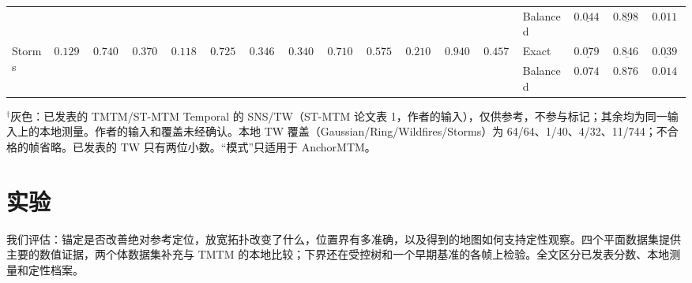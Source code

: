 \documentclass[fontset=none,zihao=5,a4paper]{ctexart}
\begin{document}
\begin{table}[htbp]
{\begin{tabular}{@{}l*{12}{c}lccc@{}}
 &  &  &  &  &  &  &  &  &  &  &  &  & Balanced & $\underline{0.0447}$ & $\underline{0.8989}$ & $\mathbf{0.0116}$ \\
\multirow{2}{*}{Storms} & \multirow{2}{*}{$0.1290$} & \multirow{2}{*}{$0.7403$} & \multirow{2}{*}{$0.3705$} & \multirow{2}{*}{$0.1180$} & \multirow{2}{*}{$0.7251$} & \multirow{2}{*}{$0.3468$} & \multirow{2}{*}{\textcolor{pubgray}{$0.3400$}} & \multirow{2}{*}{\textcolor{pubgray}{$0.7100$}} & \multirow{2}{*}{$0.5753$} & \multirow{2}{*}{\textcolor{pubgray}{$0.2100$}} & \multirow{2}{*}{\textcolor{pubgray}{$0.9400$}} & \multirow{2}{*}{$0.4579$} & Exact & $\underline{0.0790}$ & $\underline{0.8463}$ & $\underline{0.0399}$ \\
 &  &  &  &  &  &  &  &  &  &  &  &  & Balanced & $\mathbf{0.0743}$ & $\mathbf{0.8766}$ & $\mathbf{0.0140}$ \\
\bottomrule
\end{tabular}}
\par\smallskip
\parbox{\linewidth}{\footnotesize $^\dagger$灰色：已发表的 TMTM/ST-MTM Temporal 的 SNS/TW（ST-MTM 论文表 1，作者的输入），仅供参考，不参与标记；其余均为同一输入上的本地测量。作者的输入和覆盖未经确认。本地 TW 覆盖（Gaussian/Ring/Wildfires/Storms）为 64/64、1/40、4/32、11/744；不合格的帧省略。已发表的 TW 只有两位小数。“模式”只适用于 AnchorMTM。}
\end{table}

\section{实验}\label{sec:experiments}
我们评估：锚定是否改善绝对参考定位，放宽拓扑改变了什么，位置界有多准确，以及得到的地图如何支持定性观察。四个平面数据集提供主要的数值证据，两个体数据集补充与 TMTM 的本地比较；下界还在受控树和一个早期基准的各帧上检验。全文区分已发表分数、本地测量和定性档案。
\end{document}
